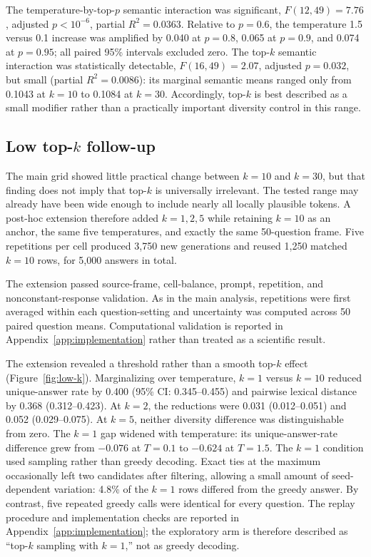 \documentclass[11pt]{article}
\begin{document}
The temperature-by-top-$p$ semantic interaction was significant,
$F(12,49)=7.76$, adjusted $p<10^{-6}$, partial $R^2=0.0363$. Relative to
$p=0.6$, the temperature 1.5 versus 0.1 increase was amplified by 0.040 at
$p=0.8$, 0.065 at $p=0.9$, and 0.074 at $p=0.95$; all paired 95\% intervals
excluded zero. The top-$k$ semantic interaction was statistically detectable,
$F(16,49)=2.07$, adjusted $p=0.032$, but small (partial $R^2=0.0086$): its
marginal semantic means ranged only from 0.1043 at $k=10$ to 0.1084 at $k=30$.
Accordingly, top-$k$ is best described as a small modifier rather than a
practically important diversity control in this range.

\subsection{Low top-$k$ follow-up}

The main grid showed little practical change between $k=10$ and $k=30$, but
that finding does not imply that top-$k$ is universally irrelevant. The tested
range may already have been wide enough to include nearly all locally plausible
tokens. A post-hoc extension therefore added $k=1,2,5$ while retaining $k=10$
as an anchor, the same five temperatures, and exactly the same 50-question
frame. Five repetitions per cell produced 3,750 new generations and reused
1,250 matched $k=10$ rows, for 5,000 answers in total.

The extension passed source-frame, cell-balance, prompt, repetition, and
nonconstant-response validation. As in the main analysis, repetitions were
first averaged within each question-setting and uncertainty was computed across
50 paired question means. Computational validation is reported in
Appendix~\ref{app:implementation} rather than treated as a scientific result.

The extension revealed a threshold rather than a smooth top-$k$ effect
(Figure~\ref{fig:low-k}). Marginalizing over temperature, $k=1$ versus $k=10$
reduced unique-answer rate by 0.400 (95\% CI: 0.345--0.455) and pairwise lexical
distance by 0.368 (0.312--0.423). At $k=2$, the reductions were 0.031
(0.012--0.051) and 0.052 (0.029--0.075). At $k=5$, neither diversity difference
was distinguishable from zero. The $k=1$ gap widened with temperature: its
unique-answer-rate difference grew from $-0.076$ at $T=0.1$ to $-0.624$ at
$T=1.5$. The $k=1$ condition used sampling rather than greedy decoding. Exact
ties at the maximum occasionally left two candidates after filtering, allowing
a small amount of seed-dependent variation: 4.8\% of the $k=1$ rows differed
from the greedy answer. By contrast, five repeated greedy calls were identical
for every question. The replay procedure and implementation checks are reported
in Appendix~\ref{app:implementation}; the exploratory arm is therefore
described as ``top-$k$ sampling with $k=1$,'' not as greedy decoding.
\end{document}
